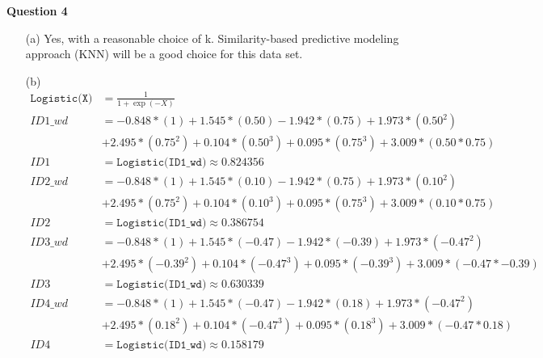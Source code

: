 \documentclass[10pt,a4paper]{article}
\begin{document}
	\textbf{Question 4} 
		\begin{enumerate}
			\item[(a)] Yes,  with a reasonable choice of k. Similarity-based predictive modeling approach (KNN) will be a good choice for this data set.
			
			\item[(b)] \begin{equation*}
				\begin{split}
					\texttt{Logistic(X)} & = \frac{1}{1 + \exp{(-X)}} \\
					ID1\_wd & = -0.848 * (1) + 1.545 * (0.50) - 1.942 * (0.75) + 1.973 * (0.50^2) \\
					& + 2.495 * (0.75^2) + 0.104 * (0.50^3) + 0.095 * (0.75^3) + 3.009 * (0.50 * 0.75) \\
					ID1 & = \texttt{Logistic(ID1\_wd)} \approx 0.824356 \\
					ID2\_wd & = -0.848 * (1) + 1.545 * (0.10) - 1.942 * (0.75) + 1.973 * (0.10^2) \\
					& + 2.495 * (0.75^2) + 0.104 * (0.10^3) + 0.095 * (0.75^3) + 3.009 * (0.10 * 0.75) \\
					ID2 & = \texttt{Logistic(ID1\_wd)} \approx 0.386754 \\
					ID3\_wd & = -0.848 * (1) + 1.545 * (-0.47) - 1.942 * (-0.39) + 1.973 * (-0.47^2) \\
					& + 2.495 * (-0.39^2) + 0.104 * (-0.47^3) + 0.095 * (-0.39^3) + 3.009 * (-0.47 * -0.39) \\
					ID3 & = \texttt{Logistic(ID1\_wd)} \approx 0.630339 \\
					ID4\_wd & = -0.848 * (1) + 1.545 * (-0.47) - 1.942 * (0.18) + 1.973 * (-0.47^2) \\
					& + 2.495 * (0.18^2) + 0.104 * (-0.47^3) + 0.095 * (0.18^3) + 3.009 * (-0.47 * 0.18) \\
					ID4 & = \texttt{Logistic(ID1\_wd)} \approx 0.158179 \\
				\end{split}
			\end{equation*}
		\end{enumerate}
		
	
		
	
\end{document}
